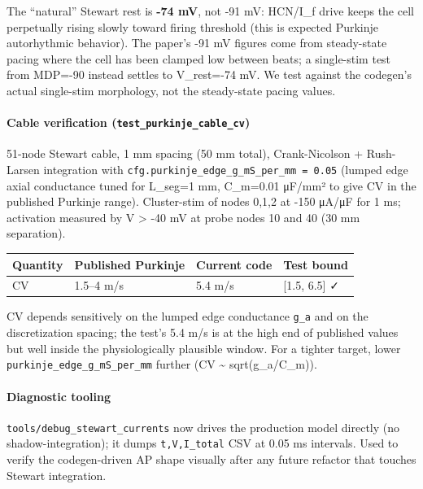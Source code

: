 \documentclass[
  11pt,
]{article}
\begin{document}
The ``natural'' Stewart rest is \textbf{-74 mV}, not -91 mV: HCN/I\_f
drive keeps the cell perpetually rising slowly toward firing threshold
(this is expected Purkinje autorhythmic behavior). The paper's -91 mV
figures come from steady-state pacing where the cell has been clamped
low between beats; a single-stim test from MDP=-90 instead settles to
V\_rest=-74 mV. We test against the codegen's actual single-stim
morphology, not the steady-state pacing values.

\hypertarget{cable-verification-test_purkinje_cable_cv}{%
\paragraph{\texorpdfstring{Cable verification
(\texttt{test\_purkinje\_cable\_cv})}{Cable verification (test\_purkinje\_cable\_cv)}}\label{cable-verification-test_purkinje_cable_cv}}

51-node Stewart cable, 1 mm spacing (50 mm total), Crank-Nicolson +
Rush- Larsen integration with
\texttt{cfg.purkinje\_edge\_g\_mS\_per\_mm\ =\ 0.05} (lumped edge axial
conductance tuned for L\_seg=1 mm, C\_m=0.01 μF/mm² to give CV in the
published Purkinje range). Cluster-stim of nodes 0,1,2 at -150 μA/μF for
1 ms; activation measured by V \textgreater{} -40 mV at probe nodes 10
and 40 (30 mm separation).

\begin{longtable}[]{@{}llll@{}}
\toprule\noalign{}
Quantity & Published Purkinje & Current code & Test bound \\
\midrule\noalign{}
\endhead
\bottomrule\noalign{}
\endlastfoot
CV & 1.5--4 m/s & 5.4 m/s & {[}1.5, 6.5{]} ✓ \\
\end{longtable}

CV depends sensitively on the lumped edge conductance \texttt{g\_a} and
on the discretization spacing; the test's 5.4 m/s is at the high end of
published values but well inside the physiologically plausible window.
For a tighter target, lower \texttt{purkinje\_edge\_g\_mS\_per\_mm}
further (CV \textasciitilde{} sqrt(g\_a/C\_m)).

\hypertarget{diagnostic-tooling}{%
\paragraph{Diagnostic tooling}\label{diagnostic-tooling}}

\texttt{tools/debug\_stewart\_currents} now drives the production model
directly (no shadow-integration); it dumps \texttt{t,V,I\_total} CSV at
0.05 ms intervals. Used to verify the codegen-driven AP shape visually
after any future refactor that touches Stewart integration.
\end{document}
